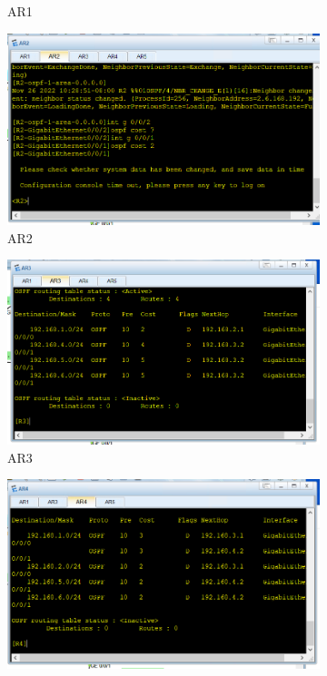 \documentclass[a4paper,twoside]{article}
\begin{document}
\begin{spacing}{1.2}
\begin{figure}[bp]
\begin{subfigure}{0.4\textwidth}
		\caption{AR1}
		\label{fig:ospfar1}
	\end{subfigure}
	\begin{subfigure}{0.4\textwidth}
		\centering
		\includegraphics[width=\textwidth]{ar2.png}
		\caption{AR2}
		\label{fig:ospfar2}
	\end{subfigure}
	\begin{subfigure}{0.4\textwidth}
		\centering
		\includegraphics[width=\textwidth]{ar3.png}
		\caption{AR3}
		\label{fig:ospfar3}
	\end{subfigure}
	\begin{subfigure}{0.4\textwidth}
		\centering
		\includegraphics[width=\textwidth]{ar4.png}

\end{subfigure}
\end{figure}
\end{spacing}
\end{document}
